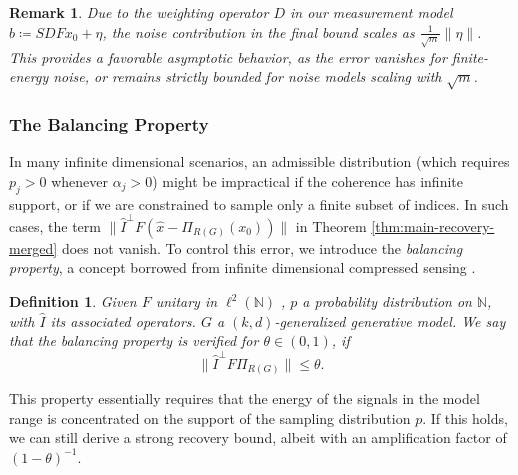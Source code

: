 \documentclass[a4paper,oneside]{amsart}
\newtheorem{definition}{Definition}[section]
\newtheorem*{remark}{Remark}
\newcommand{\lnn}{\ell^2(\mathbb{N})}
\begin{document}
\begin{remark}
    Due to the weighting operator $D$ in our measurement model $b \coloneqq SDFx_0 + \eta$, the noise contribution in the final bound scales as $\frac{1}{\sqrt{m}}\|\eta\|$. This provides a favorable asymptotic behavior, as the error vanishes for finite-energy noise, or remains strictly bounded for noise models scaling with $\sqrt{m}$.
\end{remark}

\subsubsection{The Balancing Property}
In many infinite dimensional scenarios, an admissible distribution (which requires $p_j > 0$ whenever $\alpha_j > 0$) might be impractical if the coherence has infinite support, or if we are constrained to sample only a finite subset of indices. In such cases, the term $\|\hat{I}^\perp F(\hat{x}-\Pi_{R(G)}\left(x_0\right))\|$ in Theorem \ref{thm:main-recovery-merged} does not vanish. To control this error, we introduce the \textit{balancing property}, a concept borrowed from infinite dimensional compressed sensing \cite{adcock2016generalized}.

\begin{definition}
    Given $F$ unitary in $\lnn$ , $p$ a probability distribution on $\mathbb{N}$, with $\hat{I}$ its associated operators. $G$ a $(k, d)$-generalized generative model. We say that the balancing property is verified for $\theta \in (0,1)$, if
    \begin{equation*}
        \| \hat{I}^\perp F \Pi_{R(G)}\| \leq \theta.
    \end{equation*}
\end{definition}

This property essentially requires that the energy of the signals in the model range is concentrated on the support of the sampling distribution $p$. If this holds, we can still derive a strong recovery bound, albeit with an amplification factor of $(1-\theta)^{-1}$.
\end{document}
